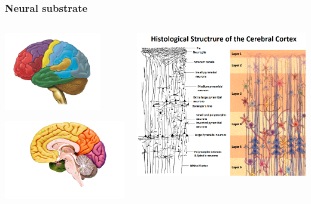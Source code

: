 \documentclass[default]{beamer}
\begin{document}
	\begin{frame}
		\frametitle{Neural substrate}
		
		\begin{columns}
			\begin{column}{0.35\textwidth}
				\includegraphics[width=0.8\textwidth]{phisio/mozg_2}
				\par\bigskip
				\hspace{-7mm}\includegraphics[width=\textwidth]{phisio/mozg}
			\end{column}
			\begin{column}{0.65\textwidth}
				\includegraphics[width=\textwidth]{phisio/cortex_layers}

\end{column}
\end{columns}
\end{frame}
\end{document}
